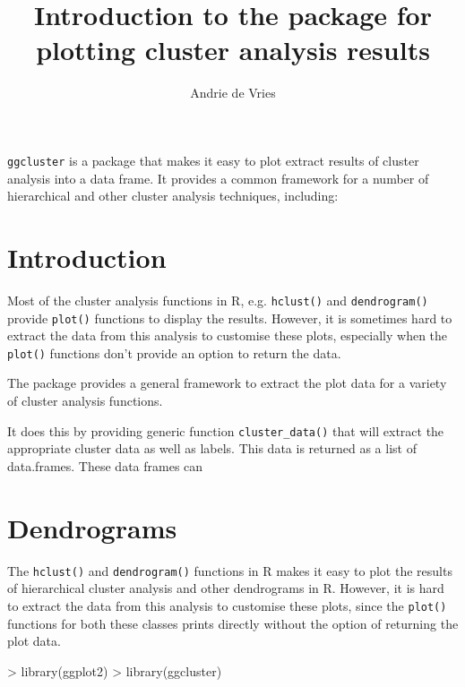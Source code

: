 \documentclass[a4paper]{article}
\title{Introduction to the \ggcluster{} package for plotting cluster analysis results}
\author{Andrie de Vries}
\newcommand{\ggcluster}{{\tt ggcluster}}
\newcommand{\code}[1]{{\tt #1}}
\begin{document}
\maketitle

\ggcluster{} is a package that makes it easy to plot extract results of cluster analysis into a data frame.  It provides a common framework for a number of hierarchical and other cluster analysis techniques, including:

\section{Introduction}

Most of the cluster analysis functions in R, e.g. \code{hclust()} and \code{dendrogram()} provide \code{plot()} functions to display the results.  However, it is sometimes hard to extract the data from this analysis to customise these plots, especially when the \code{plot()} functions don't provide an option to return the data.

The \ggluster{} package provides a general framework to extract the plot data for a variety of cluster analysis functions.

It does this by providing generic function \code{cluster_data()} that will extract the appropriate cluster data as well as labels.  This data is returned as a list of data.frames.  These data frames can 
  


\section{Dendrograms}

The \code{hclust()} and \code{dendrogram()} functions in R makes it easy to plot the results of hierarchical cluster analysis and other dendrograms in R.  However, it is hard to extract the data from this analysis to customise these plots, since the \code{plot()} functions for both these classes prints directly without the option of returning the plot data.  

\begin{Schunk}
\begin{Sinput}
> library(ggplot2)
> library(ggcluster)
\end{Sinput}
\end{Schunk}
\end{document}

